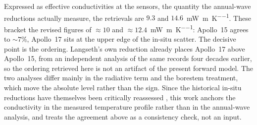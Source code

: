 \documentclass[11pt,a4paper,oneside]{report}
\newcommand{\mWmK}{\si{\milli\watt\per\meter\per\kelvin}}
\begin{document}
Expressed as effective conductivities at the sensors, the quantity
the annual-wave reductions actually measure, the retrievals are
$9.3$ and $14.6$~\mWmK. These bracket the revised
\citet{langseth1976} figures of ${\approx}10$ and
${\approx}12.4$~\mWmK: Apollo~15 agrees to ${\sim}7\%$, Apollo~17
sits at the upper edge of the in-situ scatter. The decisive point is
the ordering. Langseth's own reduction already places Apollo~17 above
Apollo~15, from an independent analysis of the same records four
decades earlier, so the ordering retrieved here is not an artifact of
the present forward model. The two analyses differ mainly in the
radiative term and the borestem treatment, which move the absolute
level rather than the sign. Since the historical in-situ reductions
have themselves been critically reassessed \citep{grott2010}, this
work anchors the conductivity in the measured temperature profile
rather than in the annual-wave analysis, and treats the agreement
above as a consistency check, not an input.
\end{document}
